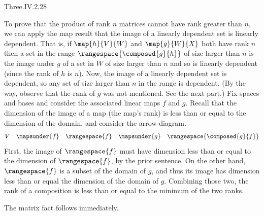 \begin{ans}{Three.IV.2.28}
\begin{exparts}
        To prove that the product of rank \( n \) matrices cannot have rank
        greater than \( n \), we can  apply the map result that the image of a
        linearly dependent set is linearly dependent.
        That is, if \( \map{h}{V}{W} \) and \( \map{g}{W}{X} \) both have rank
        \( n \) then a set in the range
        \( \rangespace{\composed{g}{h}}  \) of size
        larger than \( n \) is the image under \( g \) of a set in \( W \) of
        size larger than \( n \) and so is linearly dependent
        (since the rank of \( h \) is \( n \)).
        Now, the image of a linearly dependent set is dependent, so any set of
        size larger than \( n \) in the range is dependent.
        (By the way, observe that the rank of \( g \) was not mentioned.
        See the next part.)
       \partsitem Fix spaces and bases and consider the associated linear maps
          \( f \) and \( g \).
          Recall that the dimension of the image of a map (the map's rank) is
          less than or equal to the dimension of the domain, and consider
          the arrow diagram.
          \begin{equation*}
            \begin{matrix}
              V &\mapsunder{f} &\rangespace{f} &\mapsunder{g}
                &\rangespace{\composed{g}{f}}
            \end{matrix}
          \end{equation*}
          First, the image of \( \rangespace{f} \) must have dimension
          less than or equal to the dimension of \( \rangespace{f} \),
          by the prior sentence.
          On the other hand, \( \rangespace{f} \) is a subset of
          the domain of \( g \), and thus its image has dimension less than
          or equal the dimension of the domain of \( g \).
          Combining those two,
          the rank of a composition is less than or equal to the minimum
          of the two ranks.

          The matrix fact follows immediately.
     \end{exparts}
    
\end{ans}
